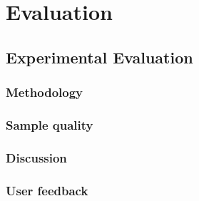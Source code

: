 
\chapter{Evaluation}

\section{Experimental Evaluation}
\subsection{Methodology}
\subsection{Sample quality}
\subsection{Discussion}
\subsection{User feedback}
